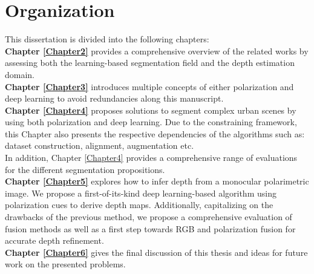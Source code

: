 \section{Organization}
This dissertation is divided into the following chapters:\\
\textbf{Chapter \ref{Chapter2}} provides a comprehensive overview of the related works by assessing both the learning-based segmentation field and the depth estimation domain.\\
\textbf{Chapter \ref{Chapter3}} introduces multiple concepts of either polarization and deep learning to avoid redundancies along this manuscript.\\
\textbf{Chapter \ref{Chapter4}} proposes solutions to segment complex urban scenes by using both polarization and deep learning. Due to the constraining framework, this Chapter also presents the respective dependencies of the algorithms such as: dataset construction, alignment, augmentation etc.\\
In addition, Chapter \ref{Chapter4} provides a comprehensive range of evaluations for the different segmentation propositions.\\
\textbf{Chapter \ref{Chapter5}} explores how to infer depth from a monocular polarimetric image. We propose a first-of-its-kind deep learning-based algorithm using polarization cues to derive depth maps. Additionally, capitalizing on the drawbacks of the previous method, we propose a comprehensive evaluation of fusion methods as well as a first step towards RGB and polarization fusion for accurate depth refinement.\\
\textbf{Chapter \ref{Chapter6}} gives the final discussion of this thesis and ideas for future work on the presented problems.

